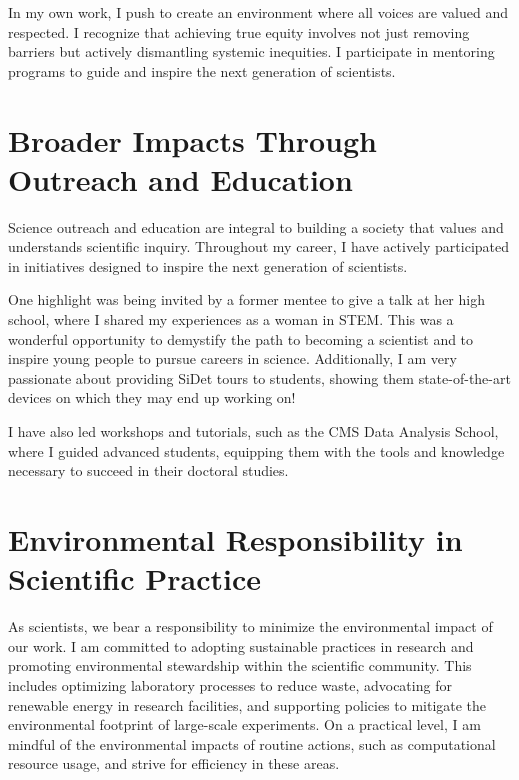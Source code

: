 {\begin{flushleft}
In my own work, I push to create an environment where all voices are valued and respected.  I recognize that achieving true equity involves not just removing barriers but actively dismantling systemic inequities. I participate in mentoring programs to guide and inspire the next generation of scientists.

\vspace{\baselineskip}
\section{Broader Impacts Through Outreach and Education}
\vspace{\baselineskip}
Science outreach and education are integral to building a society that values and understands scientific inquiry. Throughout my career, I have actively participated in initiatives designed to inspire the next generation of scientists.
 
One highlight was being invited by a former mentee to give a talk at her high school, where I shared my experiences as a woman in STEM. This was a wonderful opportunity to demystify the path to becoming a scientist and to inspire young people to pursue careers in science. Additionally, I am very passionate about providing SiDet tours to students, showing them state-of-the-art devices on which they may end up working on! 

I have also led workshops and tutorials, such as the CMS Data Analysis School, where I guided advanced students, equipping them with the tools and knowledge necessary to succeed in their doctoral studies.


\vspace{\baselineskip}
\section{Environmental Responsibility in Scientific Practice}
\vspace{\baselineskip}
As scientists, we bear a responsibility to minimize the environmental impact of our work. I am committed to adopting sustainable practices in research and promoting environmental stewardship within the scientific community. This includes optimizing laboratory processes to reduce waste, advocating for renewable energy in research facilities, and supporting policies to mitigate the environmental footprint of large-scale experiments.
On a practical level, I am mindful of the environmental impacts of routine actions, such as computational resource usage, and strive for efficiency in these areas.


\end{flushleft}}
